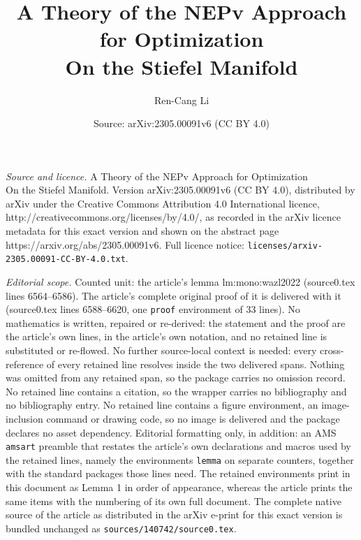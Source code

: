 \documentclass[10pt,a4paper]{amsart}
\title{A Theory of the NEPv Approach for Optimization \\ On the Stiefel Manifold}
\author{Ren-Cang Li}
\date{Source: arXiv:2305.00091v6 (CC BY 4.0)}
\begin{document}
\maketitle

\noindent\emph{Source and licence.} A Theory of the NEPv Approach for Optimization \\ On the Stiefel Manifold. Version arXiv:2305.00091v6 (CC BY 4.0), distributed by arXiv under the Creative Commons Attribution 4.0 International licence, http://creativecommons.org/licenses/by/4.0/, as recorded in the arXiv licence metadata for this exact version and shown on the abstract page https://arxiv.org/abs/2305.00091v6. Full licence notice: \texttt{licenses/arxiv-2305.00091-CC-BY-4.0.txt}.\par\smallskip

\noindent\textit{Editorial scope.} Counted unit: the article's lemma lm:mono:wazl2022 (source0.tex lines 6564--6586). The article's complete original proof of it is delivered with it (source0.tex lines 6588--6620, one \texttt{proof} environment of 33 lines). No mathematics is written, repaired or re-derived: the statement and the proof are the article's own lines, in the article's own notation, and no retained line is substituted or re-flowed.  No further source-local context is needed: every cross-reference of every retained line resolves inside the two delivered spans.  Nothing was omitted from any retained span, so the package carries no omission record.  No retained line contains a citation, so the wrapper carries no bibliography and no bibliography entry.  No retained line contains a figure environment, an image-inclusion command or drawing code, so no image is delivered and the package declares no asset dependency.  Editorial formatting only, in addition: an AMS \texttt{amsart} preamble that restates the article's own declarations and macros used by the retained lines, namely the environments \texttt{lemma} on separate counters, together with the standard packages those lines need.  The retained environments print in this document as Lemma 1 in order of appearance, whereas the article prints the same items with the numbering of its own full document.  The complete native source of the article as distributed in the arXiv e-print for this exact version is bundled unchanged as \texttt{sources/140742/source0.tex}.
\end{document}

